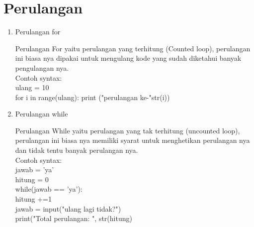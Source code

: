 \section*{Perulangan}
\begin{enumerate}
\item Perulangan for\\
\par
Perulangan For yaitu perulangan yang terhitung (Counted loop), perulangan ini biasa nya dipakai
untuk mengulang kode yang sudah diketahui banyak pengulangan nya.\\

Contoh syntax:\\
ulang = 10\\
for i in range(ulang):
	print ("perulangan ke-"str(i))
\item Perulangan while\\
\par
Perulangan While yaitu perulangan yang tak terhitung (uncounted loop), perulangan ini biasa nya memiliki syarat untuk menghetikan perulangan nya dan tidak tentu banyak perulangan nya.\\

Contoh syntax:\\
jawab = 'ya'\\
hitung = 0\\
while(jawab == 'ya'):\\
	hitung +=1\\
	jawab = input("ulang lagi tidak?")\\
print("Total perulangan: ", str(hitung)\\
\end{enumerate}

